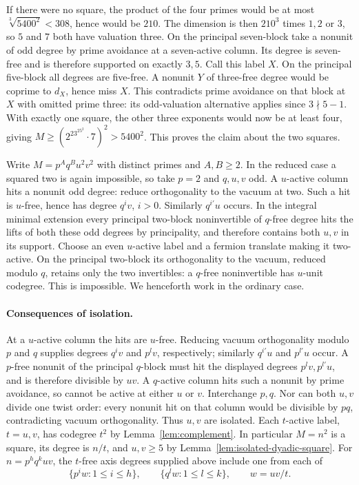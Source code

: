 \documentclass[11pt,a4paper]{article}
\numberwithin{equation}{section}
\theoremstyle{remark}
\begin{document}
If there were no square, the product of the four primes would be at most
$\sqrt[3]{5400^2}<308$, hence would be $210$. The dimension is then
$210^3$ times $1,2$ or $3$, so $5$ and $7$ both have valuation three.
On the principal seven-block take a nonunit of odd degree by prime
avoidance at a seven-active column. Its degree is seven-free and is
therefore supported on exactly $3,5$. Call this label $X$. On the
principal five-block all degrees are five-free. A nonunit $Y$ of
three-free degree would be coprime to $d_X$, hence miss $X$.
This contradicts prime avoidance on that block at $X$ with omitted
prime three: its odd-valuation alternative applies since $3\nmid5-1$.
With exactly one square, the other three exponents would now be at least
four, giving $M\ge(2^23^25^2\cdot7)^2>5400^2$. This proves the claim
about the two squares.

Write $M=p^Aq^B u^2v^2$ with distinct primes and $A,B\ge2$.
In the reduced case a squared two is again impossible, so take $p=2$
and $q,u,v$ odd. A $u$-active column hits a nonunit odd degree:
reduce orthogonality to the vacuum at two. Such a hit is $u$-free,
hence has degree $q^iv$, $i>0$. Similarly $q^{i'}u$ occurs. In the
integral minimal extension every principal two-block noninvertible of
$q$-free degree hits the lifts of both these odd degrees by principality,
and therefore contains both $u,v$ in its support. Choose an even
$u$-active label and a fermion translate making it two-active. On the
principal two-block its orthogonality to the vacuum, reduced modulo $q$,
retains only the two invertibles: a $q$-free noninvertible has
$u$-unit codegree. This is impossible. We henceforth work in the
ordinary case.

\paragraph{Consequences of isolation.}
At a $u$-active column the hits are $u$-free. Reducing vacuum
orthogonality modulo $p$ and $q$ supplies degrees $q^iv$ and $p^lv$,
respectively; similarly $q^{i'}u$ and $p^{l'}u$ occur. A $p$-free
nonunit of the principal $q$-block must hit the displayed degrees
$p^lv,p^{l'}u$, and is therefore divisible by $uv$. A $q$-active
column hits such a nonunit by prime avoidance, so cannot be active at
either $u$ or $v$. Interchange $p,q$. Nor can both $u,v$ divide one
twist order: every nonunit hit on that column would be divisible by
$pq$, contradicting vacuum orthogonality. Thus $u,v$ are isolated.
Each $t$-active label, $t=u,v$, has codegree $t^2$ by
Lemma~\ref{lem:complement}. In particular $M=n^2$ is a square, its
degree is $n/t$, and $u,v\ge5$ by Lemma~\ref{lem:isolated-dyadic-square}.
For $n=p^h q^k uv$, the $t$-free axis degrees supplied above include
one from each of
\[
 \{p^i w:1\le i\le h\},\qquad \{q^l w:1\le l\le k\},
 \qquad w=uv/t .
\]
\end{document}
